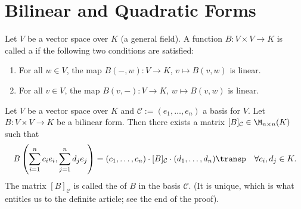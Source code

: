 \renewcommand{\thetheorem}{27.a.\arabic{theorem}}
\setcounter{theorem}{0}

\setcounter{chapter}{26}

\chapter{Bilinear and Quadratic Forms}

\begin{definition}
\label{def:bilinear_form}
Let $V$ be a vector space over $K$ (a general field). A function $B \colon V \times V \to K$ is called a  if the following two conditions are satisfied:
\begin{enumerate}[label=\textbf{(\alph*)}]
    \item For all $w \in V$, the map $B(-, w) \colon V \to K$, $v \mapsto B(v, w)$ is linear.
    \item For all $v \in V$, the map $B(v, -) \colon V \to K$, $w \mapsto B(v, w)$ is linear.
\end{enumerate}
\end{definition}

\begin{lemma}
\label{lem:matrix_rep_bilinear_form}
Let $V$ be a vector space over $K$ and $\mathcal{C} := (e_1, \dots, e_n)$ a basis for $V$. Let $B \colon V \times V \to K$ be a bilinear form. Then there exists a matrix $[B]_{\mathcal{C}} \in \M_{n \times n}(K)$ such that
\[
B\left(\sum_{i=1}^n c_i e_i, \sum_{j=1}^n d_j e_j\right) = (c_1, \dots, c_n) \cdot [B]_{\mathcal{C}} \cdot (d_1, \dots, d_n)\transp \quad \forall c_i, d_j \in K.
\]
The matrix $[B]_{\mathcal{C}}$ is called the  of $B$ in the basis $\mathcal{C}$. (It is unique, which is what entitles us to the definite article; see the end of the proof).
\end{lemma}

